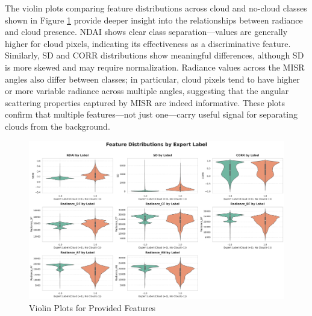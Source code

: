 \documentclass[11pt,letterpaper]{article}
\begin{document}
The violin plots comparing feature distributions across cloud and no-cloud classes shown in Figure \ref{fig:eda2} provide deeper insight into the relationships between radiance and cloud presence. NDAI shows clear class separation—values are generally higher for cloud pixels, indicating its effectiveness as a discriminative feature. Similarly, SD and CORR distributions show meaningful differences, although SD is more skewed and may require normalization. Radiance values across the MISR angles also differ between classes; in particular, cloud pixels tend to have higher or more variable radiance across multiple angles, suggesting that the angular scattering properties captured by MISR are indeed informative. These plots confirm that multiple features—not just one—carry useful signal for separating clouds from the background.
\begin{figure}[H]
    \centering
    \includegraphics[width=1\textwidth]{figs/eda2.pdf}
    \caption{Violin Plots for Provided Features}
    \label{fig:eda2}
\end{figure}\noindent
\end{document}
